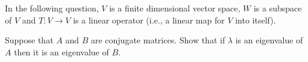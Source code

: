 \begin{questions}
  \question In the following question, $V$ is a finite dimensional vector
  space, $W$ is a subspace of $V$ and $T\colon V\to V$ is a linear operator
  (i.e., a linear map for $V$ into itself).
  \question
  \question[4] Suppose that $A$ and $B$ are conjugate matrices. Show that
  if $\lambda$ is an eigenvalue of $A$ then it is an eigenvalue of $B$.
\end{questions}
